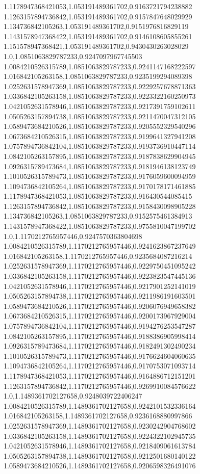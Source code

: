 1.1178947368421053,1.053191489361702,0.9163721794238882
1.1263157894736842,1.053191489361702,0.9157847648029929
1.134736842105263,1.053191489361702,0.9151976816829119
1.1431578947368422,1.053191489361702,0.9146108605855261
1.151578947368421,1.053191489361702,0.9430430263028029
1.0,1.0851063829787233,0.9247097967745503
1.0084210526315789,1.0851063829787233,0.9241147168222597
1.016842105263158,1.0851063829787233,0.9235199294089398
1.0252631578947369,1.0851063829787233,0.9229257678871363
1.0336842105263158,1.0851063829787233,0.9223322160250973
1.0421052631578946,1.0851063829787233,0.9217391759102611
1.0505263157894738,1.0851063829787233,0.9211470047312105
1.0589473684210526,1.0851063829787233,0.9205552329540296
1.0673684210526315,1.0851063829787233,0.9199641327941208
1.0757894736842104,1.0851063829787233,0.9193736910447114
1.0842105263157895,1.0851063829787233,0.9187838629904945
1.0926315789473684,1.0851063829787233,0.9181946138123749
1.1010526315789473,1.0851063829787233,0.9176059600094959
1.1094736842105264,1.0851063829787233,0.9170178171461885
1.1178947368421053,1.0851063829787233,0.916430544085415
1.1263157894736842,1.0851063829787233,0.9158430098905228
1.134736842105263,1.0851063829787233,0.9152575461384913
1.1431578947368422,1.0851063829787233,0.9755810047199702
1.0,1.1170212765957446,0.9247570363804698
1.0084210526315789,1.1170212765957446,0.9241623867237649
1.016842105263158,1.1170212765957446,0.9235684087216214
1.0252631578947369,1.1170212765957446,0.9229750451095242
1.0336842105263158,1.1170212765957446,0.9223823547445136
1.0421052631578946,1.1170212765957446,0.9217901252141019
1.0505263157894738,1.1170212765957446,0.9211986191603501
1.0589473684210526,1.1170212765957446,0.9206076949658382
1.0673684210526315,1.1170212765957446,0.9200173967929004
1.0757894736842104,1.1170212765957446,0.9194276253547287
1.0842105263157895,1.1170212765957446,0.9188386905998414
1.0926315789473684,1.1170212765957446,0.9182491302490234
1.1010526315789473,1.1170212765957446,0.9176624604060635
1.1094736842105264,1.1170212765957446,0.9170753071093714
1.1178947368421053,1.1170212765957446,0.9164886712151201
1.1263157894736842,1.1170212765957446,0.9269910084576622
1.0,1.1489361702127658,0.9248039722406247
1.0084210526315789,1.1489361702127658,0.9242101532336164
1.016842105263158,1.1489361702127658,0.9236168880997866
1.0252631578947369,1.1489361702127658,0.9230242904768602
1.0336842105263158,1.1489361702127658,0.9224322102945735
1.0421052631578946,1.1489361702127658,0.9218409061613784
1.0505263157894738,1.1489361702127658,0.9212501680140122
1.0589473684210526,1.1489361702127658,0.9206598326491076
